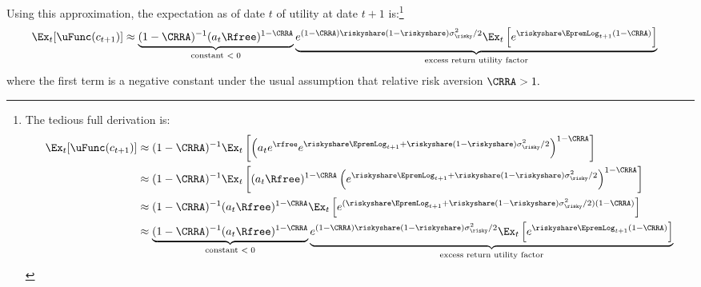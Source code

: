 Using this approximation, the expectation as of date $t$ of utility at date $t+1$ is:\footnote{The tedious full derivation is:
  \begin{equation}\begin{split}
  \Ex_{t}[\uFunc(c_{t+1})] & \approx  (1-\CRRA)^{-1}\Ex_{t}\left[\left(a_{t}e^{\rfree}e^{\riskyshare \EpremLog_{t+1}+\riskyshare(1-\riskyshare)\sigma^{2}_{\risky}/2 }\right)^{1-\CRRA}\right] \notag
\\                      & \approx  (1-\CRRA)^{-1}\Ex_{t}\left[(a_{t}\Rfree)^{1-\CRRA}\left( e^{\riskyshare \EpremLog_{t+1}+\riskyshare(1-\riskyshare)\sigma^{2}_{\risky}/2 }\right)^{1-\CRRA}\right]
\\                      & \approx  (1-\CRRA)^{-1}(a_{t}\Rfree)^{1-\CRRA}\Ex_{t}\left[e^{(\riskyshare \EpremLog_{t+1}+\riskyshare(1-\riskyshare)\sigma^{2}_{\risky}/2)  (1-\CRRA)}\right]
\\                      & \approx  \underbrace{(1-\CRRA)^{-1}(a_{t}\Rfree)^{1-\CRRA}}_{\text{constant $< 0$}}\underbrace{e^{ (1-\CRRA)\riskyshare(1-\riskyshare)\sigma^{2}_{\risky}/2}\Ex_{t}\left[e^{\riskyshare \EpremLog_{t+1}  (1-\CRRA)}\right]}_{\text{excess return utility factor}}
 \end{split}
  \end{equation}
}
\begin{equation}\label{eq:exputil}\begin{split}
  \Ex_{t}[\uFunc(c_{t+1})] & \approx  \underbrace{(1-\CRRA)^{-1}(a_{t}\Rfree)^{1-\CRRA}}_{\text{constant $< 0$}}\underbrace{e^{ (1-\CRRA)\riskyshare(1-\riskyshare)\sigma^{2}_{\risky}/2}\Ex_{t}\left[e^{\riskyshare \EpremLog_{t+1}  (1-\CRRA)}\right]}_{\text{excess return utility factor}}
 \end{split}
  \end{equation}
where the first term is a negative constant under the usual assumption that relative risk aversion $\CRRA>1.$

